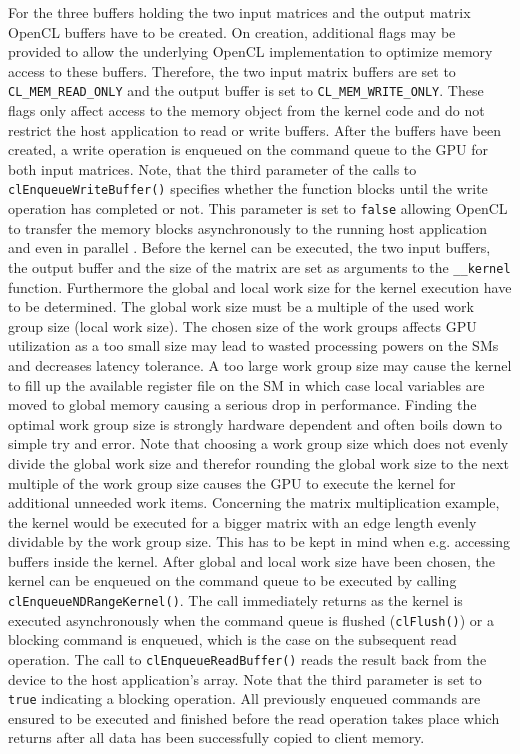 For the three buffers holding the two input matrices and the output matrix OpenCL buffers have to be created. On creation, additional flags may be provided to allow the underlying OpenCL implementation to optimize memory access to these buffers. Therefore, the two input matrix buffers are set to \lstinline!CL_MEM_READ_ONLY! and the output buffer is set to \lstinline!CL_MEM_WRITE_ONLY!. These flags only affect access to the memory object from the kernel code and do not restrict the host application to read or write buffers. 
After the buffers have been created, a write operation is enqueued on the command queue to the GPU for both input matrices. Note, that the third parameter of the calls to \lstinline!clEnqueueWriteBuffer()! specifies whether the function blocks until the write operation has completed or not. This parameter is set to \lstinline!false! allowing OpenCL to transfer the memory blocks asynchronously to the running host application and even in parallel .
Before the kernel can be executed, the two input buffers, the output buffer and the size of the matrix are set as arguments to the \lstinline!__kernel! function. Furthermore the global and local work size for the kernel execution have to be determined. The global work size must be a multiple of the used work group size (local work size). The chosen size of the work groups affects GPU utilization as a too small size may lead to wasted processing powers on the SMs and decreases latency tolerance. A too large work group size may cause the kernel to fill up the available register file on the SM in which case local variables are moved to global memory causing a serious drop in performance. Finding the optimal work group size is strongly hardware dependent and often boils down to simple try and error.
Note that choosing a work group size which does not evenly divide the global work size and therefor rounding the global work size to the next multiple of the work group size causes the GPU to execute the kernel for additional unneeded work items. Concerning the matrix multiplication example, the kernel would be executed for a bigger matrix with an edge length evenly dividable by the work group size. This has to be kept in mind when e.g. accessing buffers inside the kernel.
After global and local work size have been chosen, the kernel can be enqueued on the command queue to be executed by calling \lstinline!clEnqueueNDRangeKernel()!. The call immediately returns as the kernel is executed asynchronously when the command queue is flushed (\lstinline!clFlush()!) or a blocking command is enqueued, which is the case on the subsequent read operation. The call to \lstinline!clEnqueueReadBuffer()! reads the result back from the device to the host application's array. Note that the third parameter is set to \lstinline!true! indicating a blocking operation. All previously enqueued commands are ensured to be executed and finished before the read operation takes place which returns after all data has been successfully copied to client memory.

